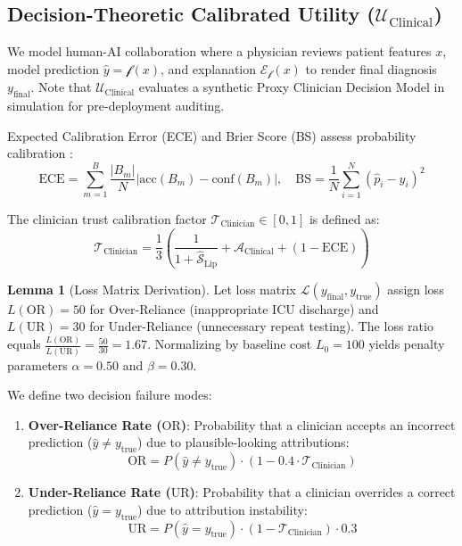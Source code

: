 \documentclass[3p,times,procedia]{elsarticle}
\theoremstyle{definition}
\newtheorem{lemma}{Lemma}
\begin{document}
\subsection{Decision-Theoretic Calibrated Utility ($\mathcal{U}_{\text{Clinical}}$)}
We model human-AI collaboration where a physician reviews patient features $x$, model prediction $\hat{y} = \mathcal{f}(x)$, and explanation $\mathcal{E}_{\mathcal{f}}(x)$ to render final diagnosis $y_{\text{final}}$. Note that $\mathcal{U}_{\text{Clinical}}$ evaluates a synthetic Proxy Clinician Decision Model in simulation for pre-deployment auditing.

Expected Calibration Error (ECE) and Brier Score (BS) assess probability calibration \cite{yeh2019fidelity}:
\begin{equation}
\text{ECE} = \sum_{m=1}^B \frac{|B_m|}{N} \left| \text{acc}(B_m) - \text{conf}(B_m) \right|, \quad \text{BS} = \frac{1}{N}\sum_{i=1}^N (\hat{p}_i - y_i)^2
\end{equation}

The clinician trust calibration factor $\mathcal{T}_{\text{Clinician}} \in [0, 1]$ is defined as:
\begin{equation}
\mathcal{T}_{\text{Clinician}} = \frac{1}{3} \left( \frac{1}{1 + \widehat{\mathcal{S}}_{\text{Lip}}} + \mathcal{A}_{\text{Clinical}} + (1 - \text{ECE}) \right)
\end{equation}

\begin{lemma}[Loss Matrix Derivation]
Let loss matrix $\mathcal{L}(y_{\text{final}}, y_{\text{true}})$ assign loss $L(\text{OR}) = 50$ for Over-Reliance (inappropriate ICU discharge) and $L(\text{UR}) = 30$ for Under-Reliance (unnecessary repeat testing). The loss ratio equals $\frac{L(\text{OR})}{L(\text{UR})} = \frac{50}{30} = 1.67$. Normalizing by baseline cost $L_0 = 100$ yields penalty parameters $\alpha = 0.50$ and $\beta = 0.30$.
\end{lemma}

We define two decision failure modes:
\begin{enumerate}\setlength{\itemsep}{0pt}\setlength{\parsep}{0pt}\setlength{\parskip}{0pt}
    \item \textbf{Over-Reliance Rate ($\text{OR}$)}: Probability that a clinician accepts an incorrect prediction ($\hat{y} \neq y_{\text{true}}$) due to plausible-looking attributions:
\begin{equation}
\text{OR} = P(\hat{y} \neq y_{\text{true}}) \cdot \left(1 - 0.4 \cdot \mathcal{T}_{\text{Clinician}}\right)
\end{equation}
    \item \textbf{Under-Reliance Rate ($\text{UR}$)}: Probability that a clinician overrides a correct prediction ($\hat{y} = y_{\text{true}}$) due to attribution instability:
\begin{equation}
\text{UR} = P(\hat{y} = y_{\text{true}}) \cdot \left(1 - \mathcal{T}_{\text{Clinician}}\right) \cdot 0.3
\end{equation}
\end{enumerate}
\end{document}

